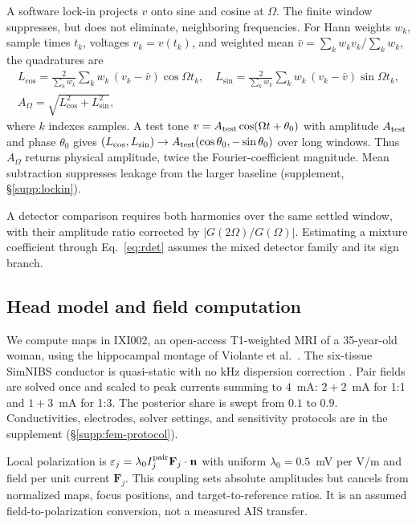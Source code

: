 A software lock-in projects $v$ onto sine and cosine at $\Omega$.
The finite window suppresses, but does not eliminate, neighboring frequencies.
For Hann weights $w_k$, sample times $t_k$, voltages $v_k=v(t_k)$, and
weighted mean $\bar v=\sum_k w_kv_k/\sum_k w_k$, the quadratures are
\begin{equation}
\begin{gathered}
L_{\cos}=\frac{2}{\sum_k w_k}\sum_k w_k\,(v_k-\bar v)\cos\Omega t_k,\quad
L_{\sin}=\frac{2}{\sum_k w_k}\sum_k w_k\,(v_k-\bar v)\sin\Omega t_k,\\
A_\Omega=\sqrt{L_{\cos}^2+L_{\sin}^2},
\end{gathered}
\label{eq:lockin}
\end{equation}
where $k$ indexes samples. A test tone
$v=A_{\rm test}\cos(\Omega t+\theta_0)$ with amplitude $A_{\rm test}$
and phase $\theta_0$ gives
$(L_{\cos},L_{\sin})\to A_{\rm test}(\cos\theta_0,-\sin\theta_0)$
over long windows. Thus $A_\Omega$ returns physical amplitude, twice the
Fourier-coefficient magnitude. Mean subtraction suppresses leakage from
the larger baseline (supplement, \S\ref{supp:lockin}).

\ifjne\else

\fi

A detector comparison requires both harmonics over the same settled window,
with their amplitude ratio corrected by $|G(2\Omega)/G(\Omega)|$.
Estimating a mixture coefficient through Eq.~\eqref{eq:rdet} assumes the mixed
detector family and its sign branch.

\subsection{Head model and field computation}\label{sec:fem-methods}
\ifjne
We compute maps in IXI002, an open-access T1-weighted MRI of a 35-year-old
woman, using the hippocampal montage of Violante et al.\ \cite{violante2023}.
The six-tissue SimNIBS conductor is quasi-static with no kHz dispersion correction
\cite{salvador2025}. Pair fields are solved once and scaled to peak currents
summing to $4$~mA: $2+2$~mA for 1:1 and $1+3$~mA for 1:3. The posterior share
is swept from $0.1$ to $0.9$. Conductivities, electrodes, solver settings,
and sensitivity protocols are in the supplement (\S\ref{supp:fem-protocol}).

Local polarization is $\varepsilon_j=\lambda_0 I_j^{\rm pair}\mathbf F_j\cdot\mathbf n$
with uniform $\lambda_0=0.5$~mV per V/m \cite{radman2009} and field per unit
current $\mathbf F_j$. This coupling sets absolute amplitudes but cancels from
normalized maps, focus positions, and target-to-reference ratios. It is an
assumed field-to-polarization conversion, not a measured AIS transfer.

